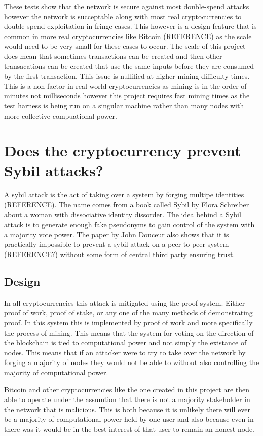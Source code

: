 \documentclass{l4proj}
\begin{document}
These tests show that the network is secure against most double-spend attacks however the network is succeptable
along with most real cryptocurrencies to double spend exploitation in fringe cases. This however is a design feature
that is common in more real cryptocurrencies like Bitcoin (REFERENCE) as the scale would need to be very small for these
cases to occur. The scale of this project does mean that sometimes transactions can be created and then other transacations
can be created that use the same inputs before they are consumed by the first transaction. This issue is nullified 
at higher mining difficulty times. This is a non-factor in real world cryptocurrencies as mining is in the order of 
minutes not milliseconds however this project requires fast mining times as the test harness is being run on a singular
machine rather than many nodes with more collective compuational power.

\section{Does the cryptocurrency prevent Sybil attacks?}
A sybil attack is the act of taking over a system by forging multipe identities (REFERENCE). The name comes from a book
called Sybil by Flora Schreiber about a woman with dissociative identity dissorder. The idea behind a Sybil attack is to 
generate enough fake pseudonyms to gain control of the system with a majority vote power. The paper by John Douceur 
also shows that it is practically impossible to prevent a sybil attack on a peer-to-peer system (REFERENCE?) without some
form of central third party ensuring trust.

\subsection{Design}
In all cryptocurrencies this attack is mitigated using the proof system. Either proof of work, proof of stake, or any one
of the many methods of demonstrating proof. In this system this is implemented by proof of work and more specifically
the process of mining. This means that the system for voting on the direction of the blockchain is tied to computational 
power and not simply the existance of nodes. This means that if an attacker were to try to take over the network by 
forging a majority of nodes they would not be able to without also controlling the majority of computational power.

Bitcoin and other cryptocurrencies like the one created in this project are then able to operate under the assumtion
that there is not a majority stakeholder in the network that is malicious. This is both because it is unlikely there will
ever be a majority of computational power held by one user and also because even in there was it would be in the best 
interest of that user to remain an honest node.
\end{document}
